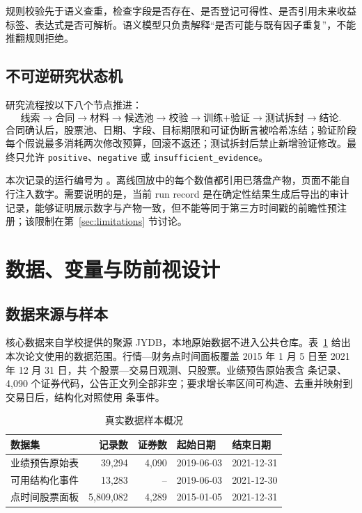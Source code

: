 \documentclass[UTF8,zihao=-4]{ctexart}
\newcommand{\code}[1]{\texttt{#1}}
\theoremstyle{accentthm}
\begin{document}
规则校验先于语义查重，检查字段是否存在、是否登记可得性、是否引用未来收益标签、表达式是否可解析。语义模型只负责解释“是否可能与既有因子重复”，不能推翻规则拒绝。

\subsection{不可逆研究状态机}

研究流程按以下八个节点推进：
\[
\text{线索}\rightarrow\text{合同}\rightarrow\text{材料}\rightarrow\text{候选池}
\rightarrow\text{校验}\rightarrow\text{训练+验证}\rightarrow\text{测试拆封}\rightarrow\text{结论}.
\]
合同确认后，股票池、日期、字段、目标期限和可证伪断言被哈希冻结；验证阶段每个假说最多消耗两次修改预算，回滚不返还；测试拆封后禁止新增验证修改。最终只允许 \code{positive}、\code{negative} 或 \code{insufficient\_evidence}。

本次记录的运行编号为 \code{\PaperRunID}。离线回放中的每个数值都引用已落盘产物，页面不能自行注入数字。需要说明的是，当前 run record 是在确定性结果生成后导出的审计记录，能够证明展示数字与产物一致，但不能等同于第三方时间戳的前瞻性预注册；该限制在第~\ref{sec:limitations} 节讨论。

\section{数据、变量与防前视设计}\label{sec:data}

\subsection{数据来源与样本}

核心数据来自学校提供的聚源 JYDB，本地原始数据不进入公共仓库。表~\ref{tab:data-summary} 给出本次论文使用的数据范围。行情—财务点时间面板覆盖 2015 年 1 月 5 日至 2021 年 12 月 31 日，共 \PanelRows 个股票—交易日观测、\PanelStocks 只股票。业绩预告原始表含 \RawForecastRows 条记录、4,090 个证券代码，公告正文列全部非空；要求增长率区间可构造、去重并映射到交易日后，结构化对照使用 \UsableEventRows 条事件。

\begin{table}[H]
  \centering
  \caption{真实数据样本概况}
  \label{tab:data-summary}
  \begin{tabular}{lrrll}
    \toprule
    数据集 & 记录数 & 证券数 & 起始日期 & 结束日期 \\
    \midrule
    业绩预告原始表 & 39,294 & 4,090 & 2019-06-03 & 2021-12-31 \\
    可用结构化事件 & 13,283 & -- & 2019-06-03 & 2021-12-30 \\
    点时间股票面板 & 5,809,082 & 4,289 & 2015-01-05 & 2021-12-31 \\
    \bottomrule
  \end{tabular}
\end{table}
\end{document}
